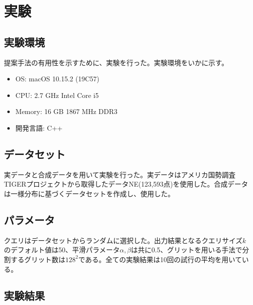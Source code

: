 \documentclass{deimj}
\begin{document}
\section{実験}
\subsection{実験環境}
提案手法の有用性を示すために、実験を行った。実験環境をいかに示す。
\begin{itemize}
  \item OS: macOS 10.15.2 (19C57)
  \item CPU: 2.7 GHz Intel Core i5
  \item Memory: 16 GB 1867 MHz DDR3
  \item 開発言語: C++
\end{itemize}

\subsection{データセット}
実データと合成データを用いて実験を行った。実データはアメリカ国勢調査TIGERプロジェクト\cite{chorochronos}から取得したデータNE(123,593点)を使用した。合成データは一様分布に基づくデータセットを作成し、使用した。

\subsection{パラメータ}
クエリはデータセットからランダムに選択した。出力結果となるクエリサイズ$k$のデフォルト値は50、平滑パラメータ$\alpha, \beta$は共に0.5、グリットを用いる手法で分割するグリット数は$128^2$である。全ての実験結果は10回の試行の平均を用いている。

\subsection{実験結果}


\end{document}
